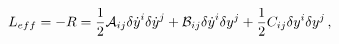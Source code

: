 \begin{equation}
    L_{eff} = - R = \frac{1}{2} {\cal A}_{ij}
     {\delta \dot y}^i {\delta \dot y}^j +
    {\cal B}_{ij} {\delta \dot y}^i \delta y^j +
    \frac{1}{2} {\cal }C_{ij}  \delta y^i \delta y^j \, ,
    \end{equation}

